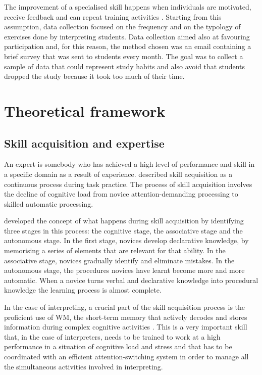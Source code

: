 \documentclass[output=paper]{../langscibook}
\begin{document}
The improvement of a specialised skill happens when individuals are motivated, receive feedback and can repeat training activities \citep{EricssonEtAl1993}. Starting from this assumption, data collection focused on the frequency and on the typology of exercises done by interpreting students. Data collection aimed also at favouring participation and, for this reason, the method chosen was an email containing a brief survey that was sent to students every month. The goal was to collect a sample of data that could represent study habits and also avoid that students dropped the study because it took too much of their time.~


\section{Theoretical framework}


\subsection{Skill acquisition and expertise}



An expert is somebody who has achieved a high level of performance and skill in a specific domain as a result of experience. \citet[290]{Ackerman1988} described skill acquisition as a continuous process during task practice. The process of skill acquisition involves the decline of cognitive load from novice attention-demanding processing to skilled automatic processing.

\citet{Anderson1995} developed the concept of what happens during skill acquisition by identifying three stages in this process: the cognitive stage, the associative stage and the autonomous stage. In the first stage, novices develop declarative knowledge, by memorising a series of elements that are relevant for that ability. In the associative stage, novices gradually identify and eliminate mistakes. In the autonomous stage, the procedures novices have learnt become more and more automatic. When a novice turns verbal and declarative knowledge into procedural knowledge the learning process is almost complete.

In the case of interpreting, a crucial part of the skill acquisition process is the proficient use of WM, the short-term memory that actively decodes and stores information during complex cognitive activities \citep{Baddeley1997}. This is a very important skill that, in the case of interpreters, needs to be trained to work at a high performance in a situation of cognitive load and stress and that has to be coordinated with an efficient attention-switching system in order to manage all the simultaneous activities involved in interpreting.
\end{document}

